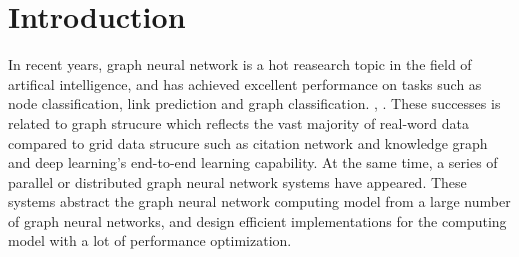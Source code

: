 \section{Introduction}

In recent years, graph neural network is a hot reasearch topic in the field of artifical intelligence, 
and has achieved excellent performance on tasks such as node classification, link prediction and graph classification.\cite{comprehensive-survey-wu-2020}
\cite{zhou2018_gnn_review}, \cite{zhou2018_gnn_review}. These successes is related to graph strucure which reflects the vast majority of real-word data compared
to grid data strucure such as citation network and knowledge graph and deep learning's end-to-end learning capability.
At the same time, a series of parallel or distributed graph neural network systems have appeared.  
These systems abstract the graph neural network computing model from a large number of graph neural networks,
and design efficient implementations for the computing model with a lot of performance optimization.

